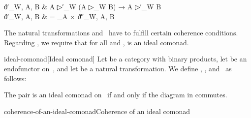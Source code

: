 \documentclass[copyright,creativecommons]{eptcs}
\newcommand{\relwithsizeof}[2]{
    \mathrel{
        \text{\makebox[0mm][c]{\phantom{}\makebox[0mm][c]{}}\phantom{}}
    }
}
\newcommand{\edges}{\AtBeginMath\scriptstyle}
\newcommand{\id}{\mathrm{id}}
\begin{document}
ϑ′_{W, A, B} & \relwithsizeof=: A ▷′_W (A ▷_W B) → A ▷′_W B                   \notag\\
\label{equation:single-prime-vartheta}
ϑ′_{W, A, B} & =                \id_A × ϑ″_{W, A, B}                          \

The natural transformations  and~ have to fulfill certain coherence
conditions. Regarding , we require that for all  and ,  is an ideal comonad.

\begin{extdefinition}{ideal-comonad}[Ideal comonad]
Let  be a category with binary products, let  be an endofunctor on~,
and let  be a natural transformation. We define ,
, and~ as follows:

The pair  is an ideal comonad on~ if and only if the diagram in
 commutes.
\end{extdefinition}
\begin{extfigure}{coherence-of-an-ideal-comonad}{Coherence of an ideal comonad}


\end{extfigure}
\end{document}
